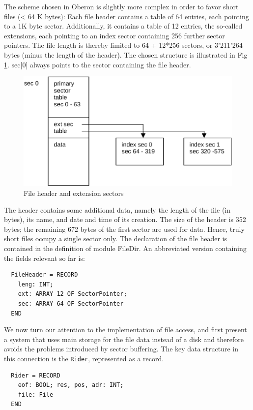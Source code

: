 The scheme chosen in Oberon is slightly more complex in order to favor short files (< 64 K
bytes): Each file header contains a table of 64 entries, each pointing to a 1K byte sector.
Additionally, it contains a table of 12 entries, the so-called extensions, each pointing to an index
sector containing 256 further sector pointers. The file length is thereby limited to 64 + 12*256
sectors, or 3'211'264 bytes (minus the length of the header). The chosen structure is illustrated in
Fig \ref{fig:file-header}. sec[0] always points to the sector containing the file header.
\begin{figure}
  \centering
  \includegraphics[width=\textwidth]{i/l}
  \caption{File header and extension sectors}
  \label{fig:file-header}
\end{figure}

The header contains some additional data, namely the length of the file (in bytes), its name, and
date and time of its creation. The size of the header is 352 bytes; the remaining 672 bytes of the
first sector are used for data. Hence, truly short files occupy a single sector only. The declaration
of the file header is contained in the definition of module FileDir. An abbreviated version
containing the fields relevant so far is:
\begin{verbatim}
  FileHeader = RECORD
    leng: INT;
    ext: ARRAY 12 OF SectorPointer;
    sec: ARRAY 64 OF SectorPointer
  END
\end{verbatim}

We now turn our attention to the implementation of file access, and first present a system that uses
main storage for the file data instead of a disk and therefore avoids the problems introduced by sector
buffering. The key data structure in this connection is the \verb|Rider|, represented as a record.
\begin{verbatim}
  Rider = RECORD
    eof: BOOL; res, pos, adr: INT;
    file: File
  END
\end{verbatim}

